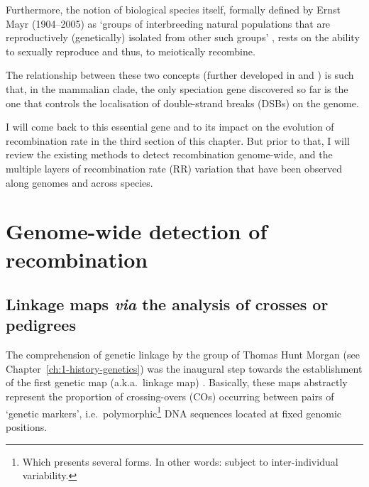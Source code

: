Furthermore, the notion of biological species itself, formally defined by Ernst Mayr (1904--2005) as ‘groups of interbreeding natural populations that are reproductively (genetically) isolated from other such groups’ \citep{mayr1999systematics}, rests on the ability to sexually reproduce and thus, to meiotically recombine.

The relationship between these two concepts (further developed in \citealp{felsenstein1981skepticism} and \citealp{butlin2005recombination}) is such that, in the mammalian clade, the only speciation gene discovered so far is the one that controls the localisation of double-strand breaks (DSBs) on the genome.

I will come back to this essential gene and to its impact on the evolution of recombination rate in the third section of this chapter. 
But prior to that, I will review the existing methods to detect recombination genome-wide, and the multiple layers of recombination rate (RR) variation that have been observed along genomes and across species.



\section{Genome-wide detection of recombination}

\subsection{Linkage maps \textit{via} the analysis of crosses or pedigrees}
\label{chap3:linkage-maps}

The comprehension of genetic linkage by the group of Thomas Hunt Morgan (see Chapter~\ref{ch:1-history-genetics}) was the inaugural step towards the establishment of the first genetic map (a.k.a.\ linkage map) \citep{sturtevant1913linear}.
Basically, these maps abstractly represent the proportion of crossing-overs (COs) occurring between pairs of ‘genetic markers’, i.e.\ polymorphic\footnote{Which presents several forms. In other words: subject to inter-individual variability.} DNA sequences located at fixed genomic positions.

